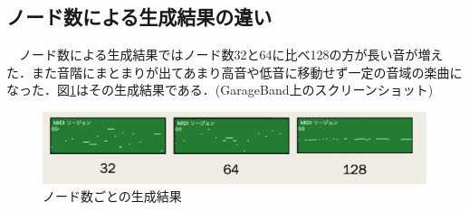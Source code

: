 \subsection{ノード数による生成結果の違い}
　ノード数による生成結果ではノード数32と64に比べ128の方が長い音が増えた．また音階にまとまりが出てあまり高音や低音に移動せず一定の音域の楽曲になった．図\ref{fig:ノード数ごとの生成結果}はその生成結果である．(GarageBand上のスクリーンショット)
\begin{figure}[h]
    \begin{screen}
    \begin{center}
        \includegraphics[scale=0.68, clip]{./img/nodo.png}
        \caption{ノード数ごとの生成結果}
        \label{fig:ノード数ごとの生成結果}
    \end{center}
    \end{screen}
\end{figure}
\newpage
